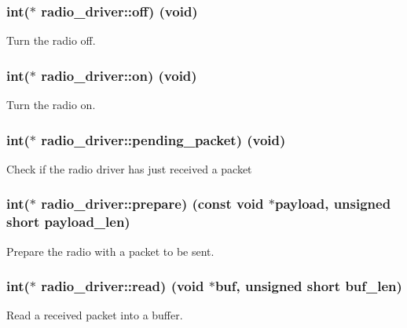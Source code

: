 \subsubsection[{off}]{\setlength{\rightskip}{0pt plus 5cm}int($\ast$  radio\+\_\+driver\+::off) (void)}\label{structradio__driver_a109dee491698150e7431e70ebd727a41}
Turn the radio off. \hypertarget{structradio__driver_adbdd3a3ba35f7b3dc80ec80ffab44fe6}{}
\subsubsection[{on}]{\setlength{\rightskip}{0pt plus 5cm}int($\ast$  radio\+\_\+driver\+::on) (void)}\label{structradio__driver_adbdd3a3ba35f7b3dc80ec80ffab44fe6}
Turn the radio on. \hypertarget{structradio__driver_a35fcb90c278a662e42d9cf5c767fded2}{}
\subsubsection[{pending\+\_\+packet}]{\setlength{\rightskip}{0pt plus 5cm}int($\ast$  radio\+\_\+driver\+::pending\+\_\+packet) (void)}\label{structradio__driver_a35fcb90c278a662e42d9cf5c767fded2}
Check if the radio driver has just received a packet \hypertarget{structradio__driver_a917063e157b641491318c3811a41b564}{}
\subsubsection[{prepare}]{\setlength{\rightskip}{0pt plus 5cm}int($\ast$  radio\+\_\+driver\+::prepare) (const void $\ast$payload, unsigned short payload\+\_\+len)}\label{structradio__driver_a917063e157b641491318c3811a41b564}
Prepare the radio with a packet to be sent. \hypertarget{structradio__driver_a838d67a29dd557b6c7669af2443109fe}{}
\subsubsection[{read}]{\setlength{\rightskip}{0pt plus 5cm}int($\ast$  radio\+\_\+driver\+::read) (void $\ast$buf, unsigned short buf\+\_\+len)}\label{structradio__driver_a838d67a29dd557b6c7669af2443109fe}
Read a received packet into a buffer. \hypertarget{structradio__driver_a69caf76a3322491ff93e1d36ec0b5480}{}

